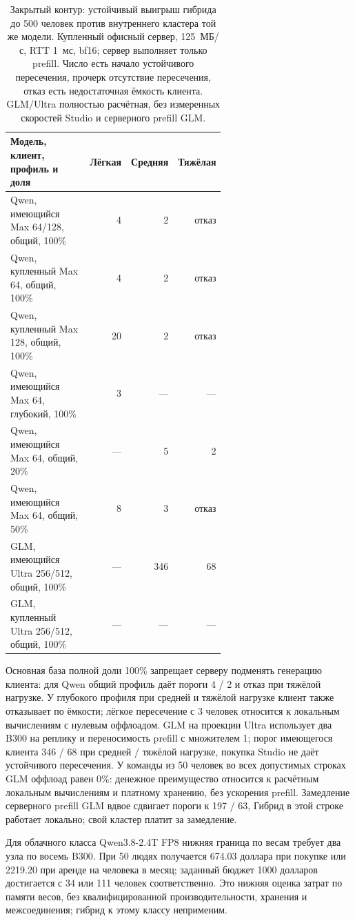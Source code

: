 \begin{table}[t]
\centering
\caption{Закрытый контур: устойчивый выигрыш гибрида до 500 человек против внутреннего кластера той же модели.
Купленный офисный сервер, 125~МБ/с, RTT 1~мс, bf16; сервер выполняет только prefill.
Число есть начало устойчивого пересечения, прочерк отсутствие пересечения, отказ есть недостаточная ёмкость клиента.
GLM/Ultra полностью расчётная, без измеренных скоростей Studio и серверного prefill GLM.}
\label{tab:closed26-crossings}
\footnotesize
\begin{tabular}{p{0.62\linewidth}rrr}
\toprule
Модель, клиент, профиль и доля & Лёгкая & Средняя & Тяжёлая \\
\midrule
Qwen, имеющийся Max 64/128, общий, 100\% & 4 & 2 & отказ \\
Qwen, купленный Max 64, общий, 100\% & 4 & 2 & отказ \\
Qwen, купленный Max 128, общий, 100\% & 20 & 2 & отказ \\
Qwen, имеющийся Max 64, глубокий, 100\% & 3 & --- & --- \\
Qwen, имеющийся Max 64, общий, 20\% & --- & 5 & 2 \\
Qwen, имеющийся Max 64, общий, 50\% & 8 & 3 & отказ \\
GLM, имеющийся Ultra 256/512, общий, 100\% & --- & 346 & 68 \\
GLM, купленный Ultra 256/512, общий, 100\% & --- & --- & --- \\
\bottomrule
\end{tabular}
\end{table}

Основная база полной доли 100\% запрещает серверу подменять генерацию клиента:
для Qwen общий профиль даёт пороги 4 / 2 и отказ при тяжёлой нагрузке.
У глубокого профиля при средней и тяжёлой нагрузке клиент также отказывает по ёмкости;
лёгкое пересечение с 3 человек относится к локальным вычислениям с нулевым оффлоадом.
GLM на проекции Ultra использует два B300 на реплику и переносимость prefill с множителем 1;
порог имеющегося клиента 346 / 68 при средней / тяжёлой нагрузке,
покупка Studio не даёт устойчивого пересечения. У команды из 50 человек во всех допустимых строках GLM оффлоад равен 0\%:
денежное преимущество относится к расчётным локальным вычислениям и платному хранению, без ускорения prefill.
Замедление серверного prefill GLM вдвое сдвигает пороги к 197 / 63,
Гибрид в этой строке работает локально; свой кластер платит за замедление.

Для облачного класса Qwen3.8-2.4T FP8 нижняя граница по весам требует два узла по восемь B300.
При 50 людях получается 674.03 доллара при покупке или 2219.20 при аренде на человека в месяц;
заданный бюджет 1000 долларов достигается с 34 или 111 человек соответственно.
Это нижняя оценка затрат по памяти весов, без квалифицированной производительности, хранения и межсоединения;
гибрид к этому классу неприменим.

